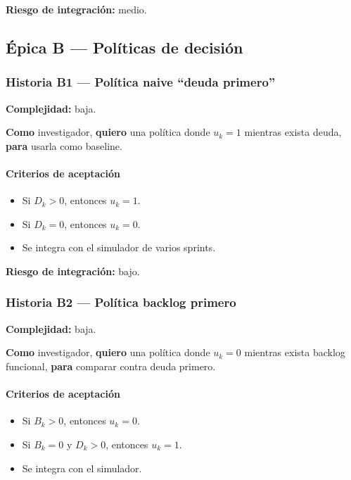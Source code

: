 \documentclass[11pt,a4paper]{article}
\begin{document}
\textbf{Riesgo de integraci\'on:} medio.

\subsection{\'Epica B --- Pol\'iticas de decisi\'on}

\subsubsection{Historia B1 --- Pol\'itica naive ``deuda primero''}

\textbf{Complejidad:} baja.

\textbf{Como} investigador, \textbf{quiero} una pol\'itica donde $u_k=1$ mientras exista deuda, \textbf{para} usarla como baseline.

\paragraph{Criterios de aceptaci\'on}

\begin{itemize}[leftmargin=*]
    \item Si $D_k>0$, entonces $u_k=1$.
    \item Si $D_k=0$, entonces $u_k=0$.
    \item Se integra con el simulador de varios sprints.
\end{itemize}

\textbf{Riesgo de integraci\'on:} bajo.

\subsubsection{Historia B2 --- Pol\'itica backlog primero}

\textbf{Complejidad:} baja.

\textbf{Como} investigador, \textbf{quiero} una pol\'itica donde $u_k=0$ mientras exista backlog funcional, \textbf{para} comparar contra deuda primero.

\paragraph{Criterios de aceptaci\'on}

\begin{itemize}[leftmargin=*]
    \item Si $B_k>0$, entonces $u_k=0$.
    \item Si $B_k=0$ y $D_k>0$, entonces $u_k=1$.
    \item Se integra con el simulador.
\end{itemize}
\end{document}
